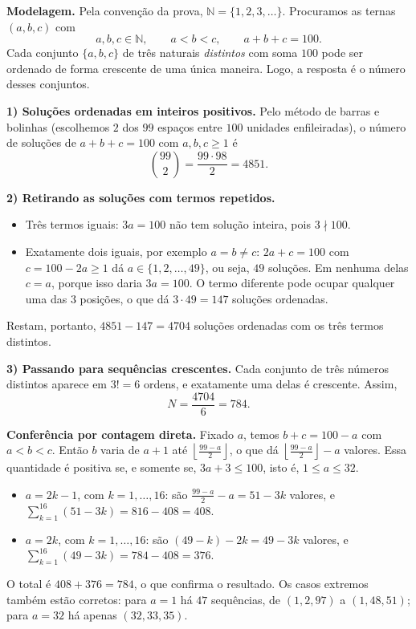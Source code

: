 \documentclass{article}%
\begin{document}
\textbf{Modelagem.} Pela convenção da prova, $\mathbb{N}=\{1,2,3,\dots\}$. Procuramos as ternas $(a,b,c)$ com
\[
a,b,c\in\mathbb{N},\qquad a<b<c,\qquad a+b+c=100 .
\]
Cada conjunto $\{a,b,c\}$ de três naturais \emph{distintos} com soma $100$ pode ser ordenado de forma crescente de uma única maneira. Logo, a resposta é o número desses conjuntos.

\textbf{1) Soluções ordenadas em inteiros positivos.} Pelo método de barras e bolinhas (escolhemos $2$ dos $99$ espaços entre $100$ unidades enfileiradas), o número de soluções de $a+b+c=100$ com $a,b,c\geq 1$ é
\[
\binom{99}{2}=\frac{99\cdot 98}{2}=4851 .
\]

\textbf{2) Retirando as soluções com termos repetidos.}
\begin{itemize}
\item Três termos iguais: $3a=100$ não tem solução inteira, pois $3\nmid 100$.
\item Exatamente dois iguais, por exemplo $a=b\neq c$: $2a+c=100$ com $c=100-2a\geq 1$ dá $a\in\{1,2,\dots,49\}$, ou seja, $49$ soluções. Em nenhuma delas $c=a$, porque isso daria $3a=100$. O termo diferente pode ocupar qualquer uma das $3$ posições, o que dá $3\cdot 49=147$ soluções ordenadas.
\end{itemize}
Restam, portanto, $4851-147=4704$ soluções ordenadas com os três termos distintos.

\textbf{3) Passando para sequências crescentes.} Cada conjunto de três números distintos aparece em $3!=6$ ordens, e exatamente uma delas é crescente. Assim,
\[
N=\frac{4704}{6}=784 .
\]

\textbf{Conferência por contagem direta.} Fixado $a$, temos $b+c=100-a$ com $a<b<c$. Então $b$ varia de $a+1$ até $\left\lfloor \frac{99-a}{2}\right\rfloor$, o que dá $\left\lfloor \frac{99-a}{2}\right\rfloor-a$ valores. Essa quantidade é positiva se, e somente se, $3a+3\leq 100$, isto é, $1\leq a\leq 32$.
\begin{itemize}
\item $a=2k-1$, com $k=1,\dots,16$: são $\frac{99-a}{2}-a=51-3k$ valores, e $\displaystyle\sum_{k=1}^{16}(51-3k)=816-408=408$.
\item $a=2k$, com $k=1,\dots,16$: são $(49-k)-2k=49-3k$ valores, e $\displaystyle\sum_{k=1}^{16}(49-3k)=784-408=376$.
\end{itemize}
O total é $408+376=784$, o que confirma o resultado. Os casos extremos também estão corretos: para $a=1$ há $47$ sequências, de $(1,2,97)$ a $(1,48,51)$; para $a=32$ há apenas $(32,33,35)$.
\end{document}
